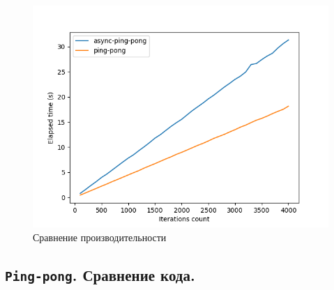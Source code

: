 \documentclass[t]{beamer}  %
\begin{document}
 \begin{frame}[fragile]
	\frametitle{\insertsection} 
	\framesubtitle{\insertsubsection}
	\vspace{-0.4cm}
	\begin{figure}
		\includegraphics[width=0.8\linewidth]{images/async-ping-pong}
		\caption*{Сравнение производительности}
	\end{figure}
 \end{frame}

 \subsection{\texttt{Ping-pong}. Сравнение кода.}
\end{document}
